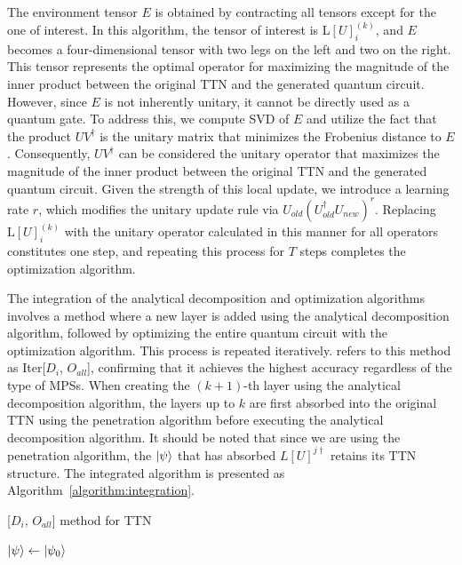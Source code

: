 \documentclass[12pt,dvipdfmx,twoside,openright]{report}
\begin{document}
The environment tensor $E$ is obtained by contracting all tensors except for the one of interest.
In this algorithm, the tensor of interest is $\mathrm{L}[U]^{(k)}_i$, and $E$ becomes a four-dimensional tensor with two legs on the left and two on the right.
This tensor represents the optimal operator for maximizing the magnitude of the inner product between the original TTN and the generated quantum circuit.
However, since $E$ is not inherently unitary, it cannot be directly used as a quantum gate.
To address this, we compute SVD of $E$ and utilize the fact that the product $UV^\dagger$ is the unitary matrix that minimizes the Frobenius distance to $E$.
Consequently, $UV^\dagger$ can be considered the unitary operator that maximizes the magnitude of the inner product between the original TTN and the generated quantum circuit.
Given the strength of this local update, we introduce a learning rate $r$, which modifies the unitary update rule via $U_{old}(U_{old}^\dagger U_{new})^r$. 
Replacing $\mathrm{L}[U]^{(k)}_i$ with the unitary operator calculated in this manner for all operators constitutes one step, and repeating this process for $T$ steps completes the optimization algorithm.

The integration of the analytical decomposition and optimization algorithms involves a method where a new layer is added using the analytical decomposition algorithm, followed by optimizing the entire quantum circuit with the optimization algorithm.
This process is repeated iteratively.
\cite{mpsdecomp} refers to this method as Iter[$D_i$, $O_{all}$], confirming that it achieves the highest accuracy regardless of the type of MPSs.
When creating the $(k+1)$-th layer using the analytical decomposition algorithm, the layers up to $k$ are first absorbed into the original TTN using the penetration algorithm before executing the analytical decomposition algorithm.
It should be noted that since we are using the penetration algorithm, the $\ket{\psi}$ that has absorbed $L[U]^{j\dagger}$ retains its TTN structure.
The integrated algorithm is presented as Algorithm~\ref{algorithm:integration}.
\begin{algorithm}[tbp]
 \caption{[$D_i$, $O_{all}$] method for TTN}
 \label{algorithm:integration}
 $\ket{\psi} \leftarrow{\ket{\psi_0}}$\;
\end{algorithm}
\end{document}
